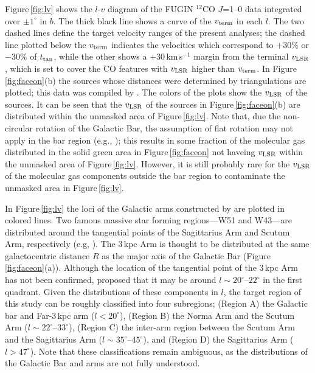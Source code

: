 \documentclass[proof]{pasj01}
\begin{document}
Figure\,\ref{fig:lv} shows the $l$-$v$ diagram of the FUGIN $^{12}$CO $J$=1--0 data integrated over $\pm1^\circ$ in $b$.
The thick black line shows a curve of the $v_{\rm term}$ in each $l$. 
The two dashed lines define the target velocity ranges of the present analyses; the dashed line plotted below the $v_{\rm term}$ indicates the velocities which correspond to $+30\%$ or $-30\%$ of $t_{\rm tan}$, while the other shows a $+30$\,km\,s$^{-1}$ margin from the terminal $v_{\rm LSR}$, which is set to cover the CO features with $v_{\rm LSR}$ higher than $v_{\rm term}$.
In Figure\,\ref{fig:faceon}(b) the sources whose distances were determined by triangulations are plotted; this data was compiled by \citet{hou2014}. The colors of the plots show the $v_{\rm LSR}$ of the sources. 
It can be seen that the $v_{\rm LSR}$ of the sources in Figure\,\ref{fig:faceon}(b) are distributed within the unmasked area of Figure\,\ref{fig:lv}. 
Note that, due the non-circular rotation of the Galactic Bar, the assumption of flat rotation may not apply in the bar region (e.g., \cite{rag1999, sor2012}); this results in some fraction of the molecular gas distributed in the solid green area in Figure\,\ref{fig:faceon} not haveing $v_{\rm LSR}$ within the unmasked area of Figure\,\ref{fig:lv}. 
However, it is still probably rare for the $v_{\rm LSR}$ of the molecular gas components outside the bar region to contaminate the unmasked area in Figure\,\ref{fig:lv}.


In Figure\,\ref{fig:lv} the loci of the Galactic arms constructed by \citet{rei2016} are plotted in colored lines.
Two famous massive star forming regions---W51 and W43---are distributed around the tangential points of the Sagittarius Arm and Scutum Arm, respectively (e.g, \cite{car1998, meh1994, mot2014, sof2018}).
The 3\,kpc Arm is thought to be distributed at the same galactocentric distance $R$ as the major axis of the Galactic Bar (Figure\,\ref{fig:faceon}(a)).
Although the location of the tangential point of the 3\,kpc Arm has not been confirmed, \citet{gre2011} proposed that it may be around $l\sim20^\circ$--$22^\circ$ in the first quadrant.
Given the distributions of these components in $l$, the target region of this study can be roughly classified into four subregions; 
(Region A) the Galactic bar and Far-3\,kpc arm ($l < 20^\circ$), (Region B) the Norma Arm and the Scutum Arm ($l\sim22^\circ$--$33^\circ$), (Region C) the inter-arm region between the Scutum Arm and the Sagittarius Arm ($l\sim35^\circ$--$45^\circ$), and (Region D) the Sagittarius Arm ($l>47^\circ$).
Note that these classifications remain ambiguous, as the distributions of the Galactic Bar and arms are not fully understood.
\end{document}
